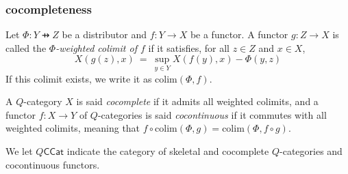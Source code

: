 \subsubsection{cocompleteness}



Let $\Phi:Y\pfun Z$ be a distributor and $f:Y\to X$ be a functor.
A functor $ g:Z\to X$ is called the \emph{$\Phi$-weighted colimit of $f$} if it satisfies, for all
$z\in Z$ and 
 $x\in X$, 
$$
X(g(z), x) \ = \  \sup_{y\in Y}X(f(y),x) - \Phi(y,z)
$$
If this colimit exists, we write it as $\mathrm{colim}(\Phi,f)$.


A $Q$-category $X$ is said \emph{cocomplete} if it admits all weighted colimits, and a functor $f:X\to Y$ of $Q$-categories is said \emph{cocontinuous} if it commutes with all weighted colimits, meaning that $f \circ \mathrm{colim}(\Phi,g)= \mathrm{colim}(\Phi, f\circ g)$.



We let $Q\mathsf{CCat}$ indicate the category of skeletal and cocomplete $Q$-categories and cocontinuous functors. 



